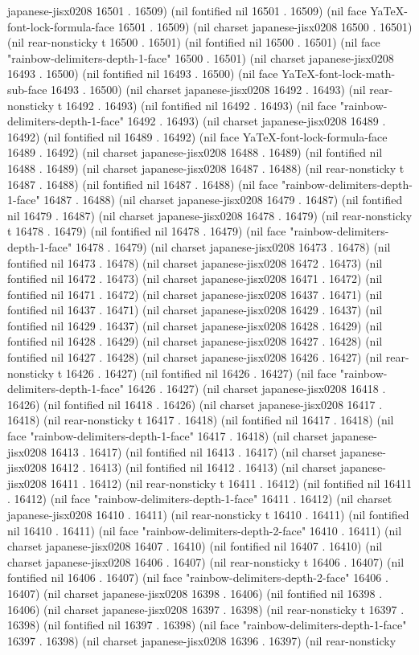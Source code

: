 japanese-jisx0208 16501 . 16509) (nil fontified nil 16501 . 16509) (nil face YaTeX-font-lock-formula-face 16501 . 16509) (nil charset japanese-jisx0208 16500 . 16501) (nil rear-nonsticky t 16500 . 16501) (nil fontified nil 16500 . 16501) (nil face "rainbow-delimiters-depth-1-face" 16500 . 16501) (nil charset japanese-jisx0208 16493 . 16500) (nil fontified nil 16493 . 16500) (nil face YaTeX-font-lock-math-sub-face 16493 . 16500) (nil charset japanese-jisx0208 16492 . 16493) (nil rear-nonsticky t 16492 . 16493) (nil fontified nil 16492 . 16493) (nil face "rainbow-delimiters-depth-1-face" 16492 . 16493) (nil charset japanese-jisx0208 16489 . 16492) (nil fontified nil 16489 . 16492) (nil face YaTeX-font-lock-formula-face 16489 . 16492) (nil charset japanese-jisx0208 16488 . 16489) (nil fontified nil 16488 . 16489) (nil charset japanese-jisx0208 16487 . 16488) (nil rear-nonsticky t 16487 . 16488) (nil fontified nil 16487 . 16488) (nil face "rainbow-delimiters-depth-1-face" 16487 . 16488) (nil charset japanese-jisx0208 16479 . 16487) (nil fontified nil 16479 . 16487) (nil charset japanese-jisx0208 16478 . 16479) (nil rear-nonsticky t 16478 . 16479) (nil fontified nil 16478 . 16479) (nil face "rainbow-delimiters-depth-1-face" 16478 . 16479) (nil charset japanese-jisx0208 16473 . 16478) (nil fontified nil 16473 . 16478) (nil charset japanese-jisx0208 16472 . 16473) (nil fontified nil 16472 . 16473) (nil charset japanese-jisx0208 16471 . 16472) (nil fontified nil 16471 . 16472) (nil charset japanese-jisx0208 16437 . 16471) (nil fontified nil 16437 . 16471) (nil charset japanese-jisx0208 16429 . 16437) (nil fontified nil 16429 . 16437) (nil charset japanese-jisx0208 16428 . 16429) (nil fontified nil 16428 . 16429) (nil charset japanese-jisx0208 16427 . 16428) (nil fontified nil 16427 . 16428) (nil charset japanese-jisx0208 16426 . 16427) (nil rear-nonsticky t 16426 . 16427) (nil fontified nil 16426 . 16427) (nil face "rainbow-delimiters-depth-1-face" 16426 . 16427) (nil charset japanese-jisx0208 16418 . 16426) (nil fontified nil 16418 . 16426) (nil charset japanese-jisx0208 16417 . 16418) (nil rear-nonsticky t 16417 . 16418) (nil fontified nil 16417 . 16418) (nil face "rainbow-delimiters-depth-1-face" 16417 . 16418) (nil charset japanese-jisx0208 16413 . 16417) (nil fontified nil 16413 . 16417) (nil charset japanese-jisx0208 16412 . 16413) (nil fontified nil 16412 . 16413) (nil charset japanese-jisx0208 16411 . 16412) (nil rear-nonsticky t 16411 . 16412) (nil fontified nil 16411 . 16412) (nil face "rainbow-delimiters-depth-1-face" 16411 . 16412) (nil charset japanese-jisx0208 16410 . 16411) (nil rear-nonsticky t 16410 . 16411) (nil fontified nil 16410 . 16411) (nil face "rainbow-delimiters-depth-2-face" 16410 . 16411) (nil charset japanese-jisx0208 16407 . 16410) (nil fontified nil 16407 . 16410) (nil charset japanese-jisx0208 16406 . 16407) (nil rear-nonsticky t 16406 . 16407) (nil fontified nil 16406 . 16407) (nil face "rainbow-delimiters-depth-2-face" 16406 . 16407) (nil charset japanese-jisx0208 16398 . 16406) (nil fontified nil 16398 . 16406) (nil charset japanese-jisx0208 16397 . 16398) (nil rear-nonsticky t 16397 . 16398) (nil fontified nil 16397 . 16398) (nil face "rainbow-delimiters-depth-1-face" 16397 . 16398) (nil charset japanese-jisx0208 16396 . 16397) (nil rear-nonsticky 